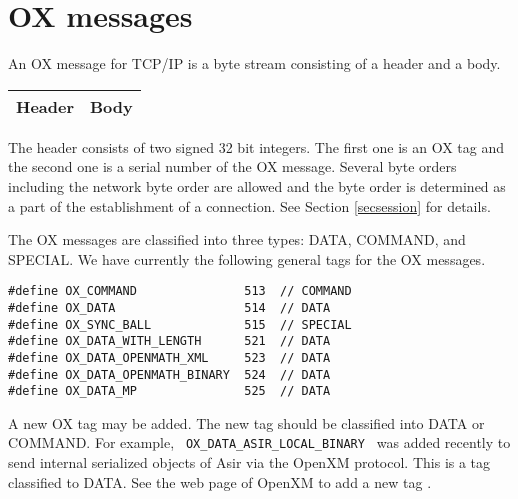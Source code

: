 
\section{OX messages}

An OX message for TCP/IP is a byte stream consisting of
a header and a body.
\begin{center}
\begin{tabular}{|c|c|}
\hline
Header	& \hspace{10mm} Body \hspace{10mm} \\
\hline
\end{tabular}
\end{center}
The header consists of two signed 32 bit integers.
The first one is an OX tag 
and the second one is a serial number of the OX message.
Several byte orders including the network byte order
are allowed and the byte order is determined as a part of
the establishment of a connection. See Section \ref{secsession} for details.

The OX messages are classified into three types:
DATA, COMMAND, and SPECIAL.
We have currently the following general tags for the OX messages.
\begin{verbatim}
#define	OX_COMMAND               513  // COMMAND
#define	OX_DATA	                 514  // DATA
#define OX_SYNC_BALL             515  // SPECIAL
#define OX_DATA_WITH_LENGTH      521  // DATA
#define OX_DATA_OPENMATH_XML     523  // DATA
#define OX_DATA_OPENMATH_BINARY  524  // DATA
#define OX_DATA_MP               525  // DATA
\end{verbatim}

A new OX tag may be added.
The new tag should be classified into DATA or COMMAND.
For example, \verb+ OX_DATA_ASIR_LOCAL_BINARY +  was added recently
to send internal serialized objects of Asir via the OpenXM protocol.
This is a tag classified to DATA.
See the web page of OpenXM to add a new tag \cite{openxm-web}.

%
